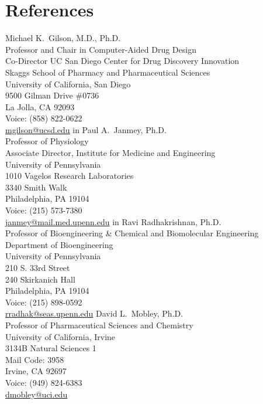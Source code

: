 \documentclass[letterpaper,11pt]{article}
\begin{document}
\section{References}
Michael K.~Gilson, M.D., Ph.D. \\
Professor and Chair in Computer-Aided Drug Design \\
Co-Director UC San Diego Center for Drug Discovery Innovation \\
Skaggs School of Pharmacy and Pharmaceutical Sciences \\
University of California, San Diego \\
9500 Gilman Drive \#0736 \\
La Jolla, CA 92093 \\
Voice: (858) 822-0622 \\
\url{mgilson@ucsd.edu}
 in
Paul A.~Janmey, Ph.D. \\
Professor of Physiology \\
Associate Director, Institute for Medicine and Engineering \\
University of Pennsylvania \\
1010 Vagelos Research Laboratories \\
3340 Smith Walk \\
Philadelphia, PA 19104 \\
Voice: (215) 573-7380 \\
\url{janmey@mail.med.upenn.edu}
 in
Ravi Radhakrishnan, Ph.D. \\
Professor of Bioengineering \& Chemical and Biomolecular Engineering \\
Department of Bioengineering \\
University of Pennsylvania \\
210 S. 33rd Street \\
240 Skirkanich Hall \\
Philadelphia, PA 19104 \\
Voice: (215) 898-0592 \\
\url{rradhak@seas.upenn.edu}
\vskip 0.2in
David L.~Mobley, Ph.D. \\
Professor of Pharmaceutical Sciences and Chemistry \\
University of California, Irvine \\
3134B Natural Sciences 1 \\
Mail Code: 3958 \\
Irvine, CA 92697 \\
Voice: (949) 824-6383 \\
\url{dmobley@uci.edu}
\end{document}
